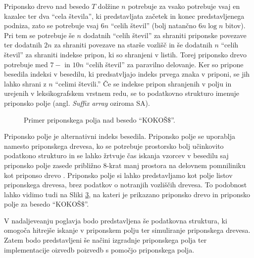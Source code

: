 Priponsko drevo nad besedo $T$ dolžine $n$ potrebuje za vsako potrebuje vsaj en kazalec ter dva \enquote{cela števila}, ki predstavljata začetek in konec predstavljenega podniza, zato se potrebuje vsaj $6n$ \enquote{celih števil} (bolj natančno $6n\log{n}$ bitov). Pri tem se potrebuje še $n$ dodatnih \enquote{celih števil} za shraniti priponske povezave ter dodatnih $2n$ za shraniti povezave na starše vozlišč in še dodatnih $n$ \enquote{celih števil} za shraniti indekse pripon, ki so shranjeni v listih. Torej priponsko drevo potrebuje med $7-$  in $10n$ \enquote{celih števil} za paravilno delovanje. Ker so pripone besedila indeksi v besedilu, ki predsatvljajo indeks prvega znaka v priponi, se jih lahko shrani z $n$ \enquote{celimi števili.} Če se indekse pripon shranjenih v polju in urejenih v leksikografskem vrstnem redu, se to podatkovno strukturo imenuje priponsko polje (angl. \textit{Suffix array} oziroma SA).

\begin{figure}[htb]
    \begin{subfigure}[t]{\linewidth}
        
        
        \centering
        \subcaption*{}
        \label{fig:aSADrevo}
    \end{subfigure}
    \begin{subfigure}[t]{1\linewidth}        
        
        \centering
        \subcaption*{}
        \label{fig:aSAPolje}
    \end{subfigure}
    \caption{Primer priponskega polja nad besedo \enquote{KOKOŠ$\$$}.} 
    \label{fig:SuffuxArray}
\end{figure}

Priponsko polje je alternativni indeks besedila. Priponsko polje se uporablja namesto priponskega drevesa, ko se potrebuje prostorsko bolj učinkovito podatkono strukturo in se lahko žrtvuje čas iskanja vzorcev v besedilu saj priponsko polje zasede približno 8-krat manj prostora na delovnem pomniliniku kot priponso drevo \cite{Manber1990}. Priponsko polje si lahko predstavljamo kot polje listov priponskega drevesa, brez podatkov o notranjih vozliščih drevesa. To podobnost lahko vidimo tudi na Sliki \ref{fig:SuffuxArray}, na kateri je prikazano priponsko drevo in priponsko polje za besedo \enquote{KOKOŠ$\$$}.

V nadaljeveanju poglavja bodo predstavljena še podatkovna struktura, ki omogoča hitrejše iskanje v priponskem polju ter simuliranje priponskega drevesa. Zatem bodo predstavljeni še načini izgradnje priponskega polja ter implementacije oizvedb poizvedb s pomočjo priponskega polja.

